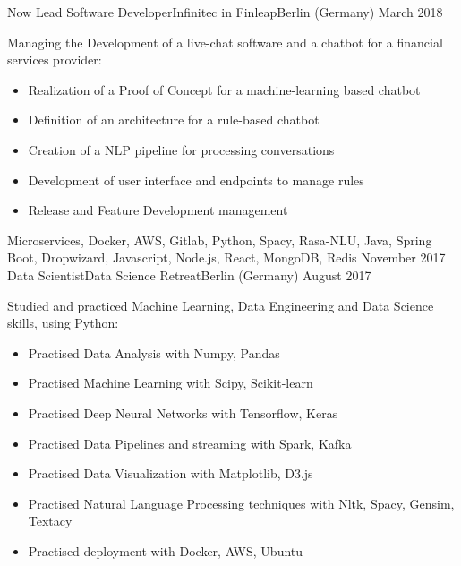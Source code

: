 %
%
%
\begin{experiences}
 \experience
    {Now}       {Lead Software Developer}{Infinitec in Finleap}{Berlin (Germany)}
    {March 2018}  {Managing the Development of a live-chat software and a chatbot for a financial services provider: 
                      \begin{itemize}
                      \item Realization of a Proof of Concept for a machine-learning based chatbot
					  \item Definition of an architecture for a rule-based chatbot	
                      \item Creation of a NLP pipeline for processing conversations 
                      \item Development of user interface and endpoints to manage rules
                      \item Release and Feature Development management  	
                      \end{itemize}
                    }
                    {Microservices, Docker, AWS, Gitlab, Python, Spacy, Rasa-NLU, Java, Spring Boot, Dropwizard, Javascript, Node.js, React, MongoDB, Redis}
  \emptySeparator
  \experience
    {November 2017}   {Data Scientist}{Data Science Retreat}{Berlin (Germany)}
    {August 2017}  {Studied and practiced Machine Learning, Data Engineering and Data Science skills, using Python: 
                      \begin{itemize}
                      \item Practised Data Analysis with Numpy, Pandas
                      \item Practised Machine Learning with Scipy, Scikit-learn
					   \item Practised Deep Neural Networks with Tensorflow, Keras
					   \item Practised Data Pipelines and streaming with Spark, Kafka
					   \item Practised Data Visualization with Matplotlib, D3.js
					   \item Practised Natural Language Processing techniques with Nltk, Spacy, Gensim, Textacy
					   \item Practised deployment with Docker, AWS, Ubuntu

\end{itemize}}
\end{experiences}
